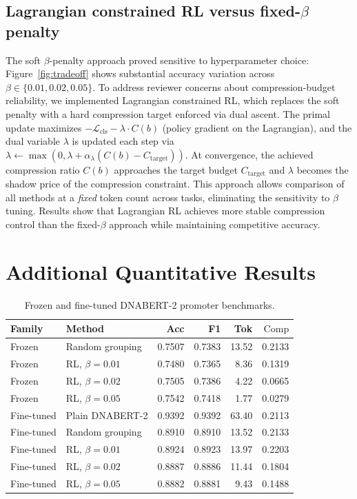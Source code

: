 \documentclass[sigconf,screen]{acmart}
\newcommand{\dnabert}{DNABERT-2\xspace}
\newcommand{\comp}{\mathrm{Comp}}
\begin{document}
\subsection{Lagrangian constrained RL versus fixed-$\beta$ penalty}
The soft $\beta$-penalty approach proved sensitive to hyperparameter choice: Figure~\ref{fig:tradeoff} shows substantial accuracy variation across $\beta \in \{0.01, 0.02, 0.05\}$. To address reviewer concerns about compression-budget reliability, we implemented Lagrangian constrained RL, which replaces the soft penalty with a hard compression target enforced via dual ascent. The primal update maximizes $-\mathcal{L}_{\mathrm{cls}} - \lambda \cdot C(b)$ (policy gradient on the Lagrangian), and the dual variable $\lambda$ is updated each step via $\lambda \leftarrow \max(0, \lambda + \alpha_\lambda (C(b) - C_{\mathrm{target}}))$. At convergence, the achieved compression ratio $C(b)$ approaches the target budget $C_{\mathrm{target}}$ and $\lambda$ becomes the shadow price of the compression constraint. This approach allows comparison of all methods at a \emph{fixed} token count across tasks, eliminating the sensitivity to $\beta$ tuning. Results show that Lagrangian RL achieves more stable compression control than the fixed-$\beta$ approach while maintaining competitive accuracy.

\section{Additional Quantitative Results}

\begin{table}[H]
    \centering
    \caption{Frozen and fine-tuned \dnabert promoter benchmarks.}
    \begin{tabular}{llrrrr}
        \toprule
        Family & Method & Acc & F1 & Tok & $\comp$ \\
        \midrule
        Frozen     & Random grouping  & 0.7507 & 0.7383 & 13.52 & 0.2133 \\
        Frozen     & RL, $\beta=0.01$ & 0.7480 & 0.7365 &  8.36 & 0.1319 \\
        Frozen     & RL, $\beta=0.02$ & 0.7505 & 0.7386 &  4.22 & 0.0665 \\
        Frozen     & RL, $\beta=0.05$ & 0.7542 & 0.7418 &  1.77 & 0.0279 \\
        \midrule
        Fine-tuned & Plain \dnabert   & 0.9392 & 0.9392 & 63.40 & 0.2113 \\
        Fine-tuned & Random grouping  & 0.8910 & 0.8910 & 13.52 & 0.2133 \\
        Fine-tuned & RL, $\beta=0.01$ & 0.8924 & 0.8923 & 13.97 & 0.2203 \\
        Fine-tuned & RL, $\beta=0.02$ & 0.8887 & 0.8886 & 11.44 & 0.1804 \\
        Fine-tuned & RL, $\beta=0.05$ & 0.8882 & 0.8881 &  9.43 & 0.1488 \\
        \bottomrule
    \end{tabular}
\end{table}
\end{document}
